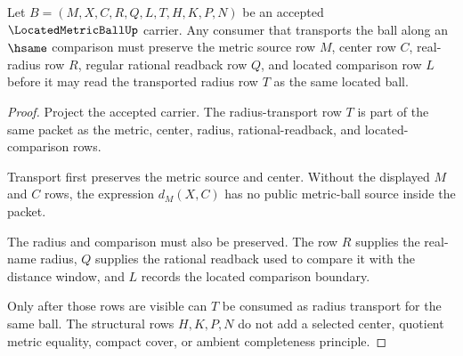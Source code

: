\begin{theorem}
\label{thm:located-metric-ball-radius-transport}
Let $B=(M,X,C,R,Q,L,T,H,K,P,N)$ be an accepted $\LocatedMetricBallUp$ carrier. Any consumer that transports the ball along an $\hsame$ comparison must preserve the metric source row $M$, center row $C$, real-radius row $R$, regular rational readback row $Q$, and located comparison row $L$ before it may read the transported radius row $T$ as the same located ball.
\end{theorem}
\begin{proof}
Project the accepted carrier. The radius-transport row $T$ is part of the same packet as the metric, center, radius, rational-readback, and located-comparison rows.

Transport first preserves the metric source and center. Without the displayed $M$ and $C$ rows, the expression $d_M(X,C)$ has no public metric-ball source inside the packet.

The radius and comparison must also be preserved. The row $R$ supplies the real-name radius, $Q$ supplies the rational readback used to compare it with the distance window, and $L$ records the located comparison boundary.

Only after those rows are visible can $T$ be consumed as radius transport for the same ball. The structural rows $H,K,P,N$ do not add a selected center, quotient metric equality, compact cover, or ambient completeness principle.
\end{proof}




